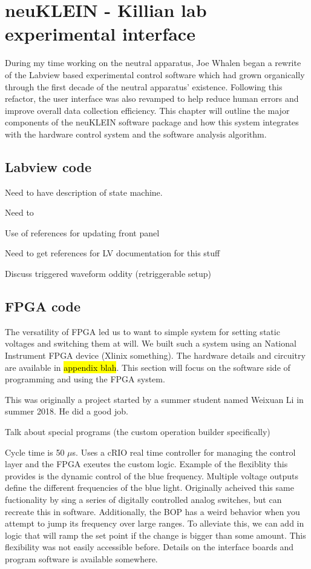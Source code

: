 \chapter{neuKLEIN - Killian lab experimental interface} 
\label{app:neuKLEIN}
During my time working on the neutral apparatus, Joe Whalen began a rewrite of the Labview based experimental control software which had grown organically through the first decade of the neutral apparatus' existence. 
Following this refactor, the user interface was also revamped to help reduce human errors and improve overall data collection efficiency. 
This chapter will outline the major components of the neuKLEIN software package and how this system integrates with the hardware control system and the software analysis algorithm.

\section{Labview code}
Need to have description of state machine.

Need to 

Use of references for updating front panel

Need to get references for LV documentation for this stuff

Discuss triggered waveform oddity (retriggerable setup)




\section{FPGA code}
The versatility of FPGA led us to want to simple system for setting static voltages and switching them at will. We built such a system using an National Instrument FPGA device (Xlinix something). The hardware details and circuitry are available in \hl{appendix blah}. This section will focus on the software side of programming and using the FPGA system.

This was originally a project started by a summer student named Weixuan Li in summer 2018. He did a good job.

Talk about special programs (the custom operation builder specifically)

Cycle time is 50 $\mu$s.
Uses a cRIO real time controller for managing the control layer and the FPGA exeutes the custom logic.
Example of the flexiblity this provides is the dynamic control of the blue frequency.
Multiple voltage outputs define the different frequencies of the blue light.
Originally acheived this same fuctionality by sing a series of digitally controlled analog switches, but can recreate this in software.
Additionally, the BOP has a weird behavior when you attempt to jump its frequency over large ranges. To alleviate this, we can add in logic that will ramp the set point if the change is bigger than some amount.
This flexibility was not easily accessible before.
Details on the interface boards and program software is available somewhere.

